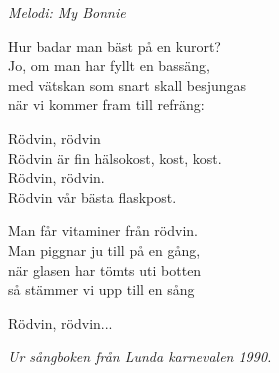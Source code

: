 {\footnotesize\textit{Melodi: My Bonnie}}\par
\vspace{10pt}
Hur badar man bäst på en kurort?\\
Jo, om man har fyllt en bassäng,\\
med vätskan som snart skall besjungas\\
när vi kommer fram till refräng:\par
\vspace{10pt}
Rödvin, rödvin\\
Rödvin är fin hälsokost, kost, kost.\\
Rödvin, rödvin.\\
Rödvin vår bästa flaskpost.\par
\vspace{10pt}
Man får vitaminer från rödvin.\\
Man piggnar ju till på en gång,\\
när glasen har tömts uti botten\\
så stämmer vi upp till en sång\par
\vspace{10pt}
Rödvin, rödvin...\par
\vspace{10pt}
{\footnotesize\textit{Ur sångboken från Lunda karnevalen 1990.}}
